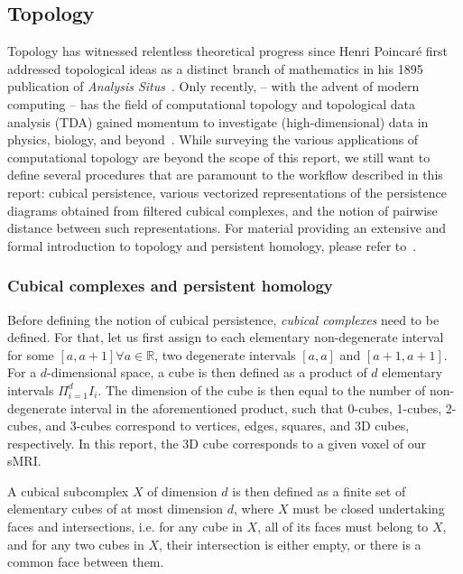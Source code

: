 \documentclass{article}
\begin{document}
\subsection{Topology}

Topology has witnessed relentless theoretical progress since Henri Poincaré first addressed
topological ideas as a distinct branch of mathematics in his 1895 publication of \textit{Analysis
Situs}~\citep{poincare1895analysis, james1999history}. Only recently, -- with the advent of modern
computing -- has the field of computational topology and topological data analysis (TDA) gained
momentum to investigate (high-dimensional) data in physics, biology, and
beyond~\citep{dey1999computational, ghrist2008barcodes, amezquita2020shape}. While surveying the
various applications of computational topology are beyond the scope of this report, we still want to
define several procedures that are paramount to the workflow described in this report: cubical
persistence, various vectorized representations of the persistence diagrams obtained from filtered
cubical complexes, and the notion of pairwise distance between such representations. For material
providing an extensive and formal introduction to topology and persistent homology, please refer
to~\citet{freedman2009algebraic, edelsbrunner2010computational, ghrist2008barcodes}.


\subsubsection{Cubical complexes and persistent homology}

Before defining the notion of cubical persistence, \emph{cubical complexes} need to be defined. For
that, let us first assign to each elementary non-degenerate interval for some $[a,a+1]\forall
a\in\mathbb{R}$, two degenerate intervals $[a,a]$ and $[a+1,a+1]$. For a
$d$-dimensional space, a cube is then defined as a product of $d$ elementary intervals
$\Pi_{i=1}^{d}I_i$. The dimension of the cube is then equal to the number of non-degenerate interval
in the aforementioned product, such that 0-cubes, 1-cubes, 2-cubes, and 3-cubes correspond to
vertices, edges, squares, and 3D cubes, respectively. In this report, the 3D cube corresponds to a
given voxel of our sMRI.

A cubical subcomplex $X$ of dimension $d$ is then defined as a finite set of elementary cubes of at
most dimension $d$, where $X$ must be closed undertaking faces and intersections, i.e. for any cube
in $X$, all of its faces must belong to $X$, and for any two cubes in $X$, their intersection is
either empty, or there is a common face between them.
\end{document}

